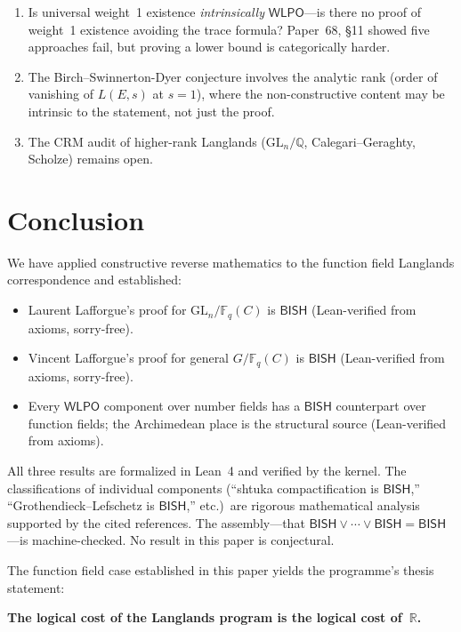 \documentclass[11pt]{article}
\theoremstyle{plain}
\theoremstyle{definition}
\theoremstyle{remark}
\newcommand{\Q}{\mathbb{Q}}
\newcommand{\R}{\mathbb{R}}
\newcommand{\Fq}{\mathbb{F}_q}
\newcommand{\GL}{\mathrm{GL}}
\newcommand{\CRM}{\mathrm{CRM}}
\newcommand{\BISH}{\mathsf{BISH}}
\newcommand{\WLPO}{\mathsf{WLPO}}
\begin{document}
\begin{enumerate}
\item Is universal weight~1 existence \emph{intrinsically} $\WLPO$---is there
  no proof of weight~1 existence avoiding the trace formula? Paper~68, \S11
  showed five approaches fail, but proving a lower bound is categorically
  harder.
\item The Birch--Swinnerton-Dyer conjecture involves the analytic rank (order
  of vanishing of $L(E,s)$ at $s = 1$), where the non-constructive content may
  be intrinsic to the statement, not just the proof.
\item The $\CRM$ audit of higher-rank Langlands ($\GL_n/\Q$,
  Calegari--Geraghty, Scholze) remains open.
\end{enumerate}

\section{Conclusion}\label{sec:conclusion}

We have applied constructive reverse mathematics to the function field
Langlands correspondence and established:

\begin{itemize}
\item Laurent Lafforgue's proof for $\GL_n/\Fq(C)$ is $\BISH$
  (Lean-verified from axioms, sorry-free).
\item Vincent Lafforgue's proof for general $G/\Fq(C)$ is $\BISH$
  (Lean-verified from axioms, sorry-free).
\item Every $\WLPO$ component over number fields has a $\BISH$ counterpart
  over function fields; the Archimedean place is the structural source
  (Lean-verified from axioms).
\end{itemize}

All three results are formalized in Lean~4 and verified by the kernel. The
classifications of individual components (``shtuka compactification is
$\BISH$,'' ``Grothendieck--Lefschetz is $\BISH$,'' etc.)\ are rigorous
mathematical analysis supported by the cited references. The assembly---that
$\BISH \vee \cdots \vee \BISH = \BISH$---is machine-checked. No result in this
paper is conjectural.

\noindent
The function field case established in this paper yields the programme's thesis
statement:

\begin{mdframed}[linecolor=black,linewidth=1.5pt]
\begin{center}
\textbf{The logical cost of the Langlands program is the logical cost of~$\R$.}
\end{center}
\end{mdframed}
\end{document}
